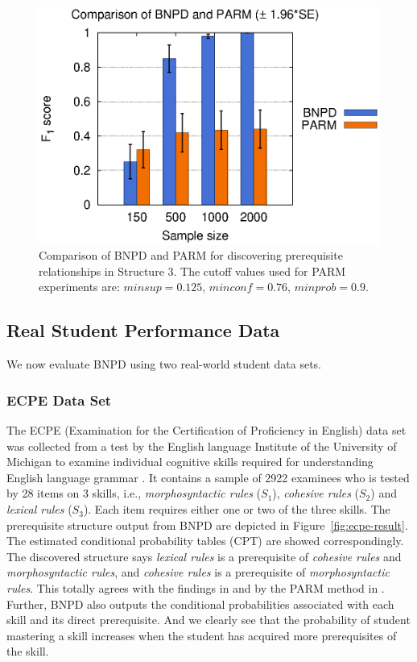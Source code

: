 \documentclass{edm_template}
\begin{document}
{		\begin{figure}[!th]
			\begin{center}
				\centering
					\includegraphics[width=0.7\linewidth]{figures/F1_parm.eps}
			\end{center}
			\caption{Comparison of BNPD and PARM for discovering prerequisite relationships in Structure 3. The cutoff values used for PARM experiments are: $ minsup=0.125$, $minconf=0.76$, $minprob=0.9$.}
			\label{fig:f1-parm} 
		\end{figure}	 
	
	\subsection{Real Student Performance Data}
	\label{sec:real}
	We now evaluate BNPD using two real-world student data sets.
	
	\subsubsection{ECPE Data Set}
	The ECPE (Examination for the Certification of Proficiency in English) data set was collected from a test by the English language Institute
	of the University of Michigan to examine individual cognitive skills required for understanding English language grammar \cite{templin2014hierarchical}.
	It contains a sample of 2922 examinees who is tested by 28 items on 3 skills, i.e., \emph{morphosyntactic rules} ($S_1$), \emph{cohesive rules} ($S_2$) 
	and \emph{lexical rules} ($S_3$). Each item requires either one or two of the three skills. 
	The prerequisite structure output from BNPD are depicted in Figure~\ref{fig:ecpe-result}. The estimated conditional probability tables (CPT) are showed correspondingly.
	The discovered structure says \emph{lexical rules} is a prerequisite of \emph{cohesive rules} and \emph{morphosyntactic rules}, 
	and \emph{cohesive rules} is a prerequisite of \emph{morphosyntactic rules}. 
	This totally agrees with the findings in \cite{templin2014hierarchical} and by the PARM method in \cite{chen2015discovering}.
	Further, BNPD also outputs the conditional probabilities associated with each skill and its direct prerequisite.
	And we clearly see that the probability of student mastering a skill increases when the student has acquired more prerequisites of the skill.
	
}
\end{document}
